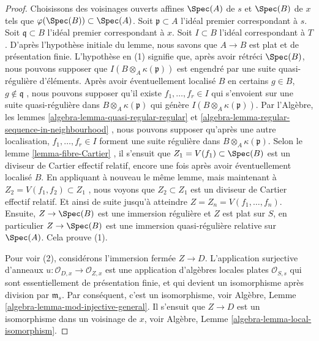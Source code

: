 \begin{proof}
Choisissons des voisinages ouverts affines  $\Spec(A)$  de  $s$  et
 $\Spec(B)$  de  $x$  tels que  $\varphi(\Spec(B)) \subset \Spec(A)$. Soit  $\mathfrak p \subset A$  l'idéal
premier correspondant à  $s$. Soit  $\mathfrak q \subset B$  l'idéal premier
correspondant à  $x$. Soit  $I \subset B$  l'idéal correspondant à
 $T$. D'après l'hypothèse initiale du lemme, nous savons que  $A \to B$ 
est plat et de présentation finie. L'hypothèse en (1) signifie que, après avoir
rétréci  $\Spec(B)$, nous pouvons supposer que  $I(B \otimes_A \kappa(\mathfrak p))$  est engendré par une
suite quasi-régulière d'éléments. Après avoir éventuellement localisé  $B$ 
en certains  $g \in B$,  $g \not \in \mathfrak q$ , nous pouvons supposer qu'il existe
 $f_1, \ldots, f_r \in I$  qui s'envoient sur une suite quasi-régulière dans  $B \otimes_A \kappa(\mathfrak p)$  qui
génère  $I(B \otimes_A \kappa(\mathfrak p))$. Par l'Algèbre, les lemmes  \ref{algebra-lemma-quasi-regular-regular}  et  \ref{algebra-lemma-regular-sequence-in-neighbourhood} , nous
pouvons supposer qu'après une autre localisation,  $f_1, \ldots, f_r \in I$  forment une suite
régulière dans  $B \otimes_A \kappa(\mathfrak p)$. Selon le lemme  \ref{lemma-fibre-Cartier} , il s'ensuit que
 $Z_1 = V(f_1) \subset \Spec(B)$  est un diviseur de Cartier effectif relatif, encore une fois après
avoir éventuellement localisé  $B$. En appliquant à nouveau le même lemme,
mais maintenant à  $Z_2 = V(f_1, f_2) \subset Z_1$ , nous voyons que  $Z_2 \subset Z_1$  est un diviseur de
Cartier effectif relatif. Et ainsi de suite jusqu'à atteindre  $Z = Z_n = V(f_1, \ldots, f_n)$.
Ensuite,  $Z \to \Spec(B)$  est une immersion régulière et  $Z$  est plat sur
 $S$, en particulier  $Z \to \Spec(B)$  est une immersion quasi-régulière
relative sur  $\Spec(A)$. Cela prouve (1).

\medskip\noindent
Pour voir (2), considérons l'immersion fermée  $Z \to D$. L'application
surjective d'anneaux  $u : \mathcal{O}_{D, x} \to \mathcal{O}_{Z, x}$  est une application d'algèbres locales plates
 $\mathcal{O}_{S, s}$ qui sont essentiellement de présentation finie, et qui devient un
isomorphisme après division par  $\mathfrak m_s$. Par conséquent, c'est un
isomorphisme, voir Algèbre, Lemme  \ref{algebra-lemma-mod-injective-general}. Il s'ensuit que  $Z \to D$  est
un isomorphisme dans un voisinage de  $x$, voir Algèbre, Lemme
 \ref{algebra-lemma-local-isomorphism}.


\end{proof}
